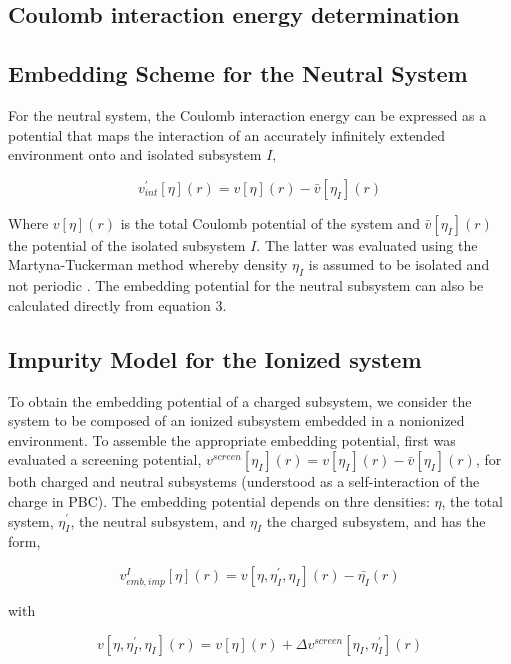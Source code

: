 \documentclass[12pt,a4paper]{article}
\begin{document}
\subsection{Coulomb interaction energy determination}



\subsection{Embedding Scheme for the Neutral System}

For the neutral system, the Coulomb interaction energy can be expressed as a potential that maps the interaction of an accurately infinitely extended
environment onto and isolated subsystem $I$,

\begin{equation}
	v^{'}_{int} [\eta] (r) = v[\eta](r) - \bar{v} [\eta_I](r)
\end{equation}

Where $v[\eta](r)$ is the total Coulomb potential of the system and $\bar{v} [\eta_I](r)$ the potential of the isolated subsystem $I$. The latter was
evaluated using the Martyna-Tuckerman method whereby density $\eta_I$ is assumed to be isolated and not periodic \cite{martyna1999reciprocal}.
The embedding potential for the neutral subsystem can also be calculated directly from equation $3$.

\subsection{Impurity Model for the Ionized system}

To obtain the embedding potential of a charged subsystem, we consider the system to be composed of an ionized subsystem embedded in a nonionized
environment. To assemble the appropriate embedding potential, first was evaluated a screening potential,
$v^{screen}[\eta_I](r) = v[\eta_I](r) - \bar{v} [\eta_I](r)$, for both charged and neutral subsystems (understood as a self-interaction of the
charge in PBC). The embedding potential depends on thre densities: $\eta$, the total system, $\eta^{'}_I$, the neutral subsystem, and $\eta_I$ the
charged subsystem, and has the form,

\begin{equation}
	v^I_{emb,imp}[\eta](r) = v[\eta, \eta^{'}_I, \eta_I](r) - \bar{\eta_I}(r)
\end{equation}

with

\begin{equation}
	v[\eta, \eta^{'}_I, \eta_I](r) = v[\eta](r) + \Delta{v}^{screen}[\eta_I, \eta^{'}_I](r)
\end{equation}
\end{document}
